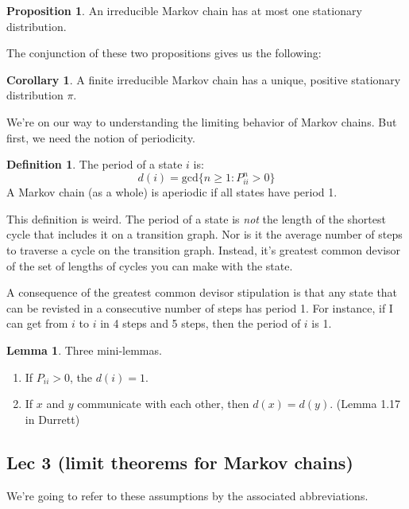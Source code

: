 \documentclass[12pt]{article}
\theoremstyle{definition}
\newtheorem{definition}{Definition}[section]
\newtheorem{corollary}{Corollary}[theorem]
\newtheorem{lemma}[theorem]{Lemma}
\newtheorem{proposition}{Proposition}[section]
\begin{document}
\begin{proposition}
  An irreducible Markov chain has at most one stationary distribution.
\end{proposition}


The conjunction of these two propositions gives us the following:

\begin{corollary}
  A finite irreducible Markov chain has a unique, positive stationary distribution $\pi$.
\end{corollary}

We're on our way to understanding the limiting behavior of Markov chains. But first, we need the notion of periodicity.

\begin{definition}
  The period of a state $i$ is:
$$
d(i) = \text{gcd}\{n \geq 1: P_{ii}^n > 0\}
$$
A Markov chain (as a whole) is aperiodic if all states have period 1.
\end{definition}

This definition is weird. The period of a state is \textit{not} the length of the shortest cycle that includes it on a transition graph. Nor is it the average number of steps to traverse a cycle on the transition graph. Instead, it's greatest common devisor of the set of lengths of cycles you can make with the state.

A consequence of the greatest common devisor stipulation is that any state that can be revisted in a consecutive number of steps has period 1. For instance, if I can get from $i$ to $i$ in 4 steps and 5 steps, then the period of $i$ is 1.

\begin{lemma}
  Three mini-lemmas.

  \begin{enumerate}
    \item If $P_{ii} >0$, the $d(i) = 1$.
    \item If $x$ and $y$ communicate with each other, then $d(x) = d(y)$. (Lemma 1.17 in Durrett)
  \end{enumerate}
\end{lemma}

\subsection{Lec 3 (limit theorems for Markov chains)}

We're going to refer to these assumptions by the associated abbreviations.
\end{document}
